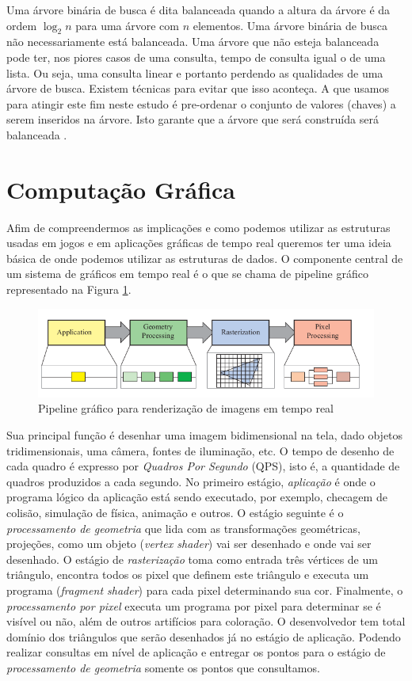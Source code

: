 Uma árvore binária de busca é dita balanceada quando a altura da árvore é da ordem $\log_{2}{n}$ para uma árvore com $n$ elementos. Uma árvore binária de busca não necessariamente está balanceada. Uma árvore que não esteja balanceada pode ter, nos piores casos de uma consulta, tempo de consulta igual o de uma lista. Ou seja, uma consulta linear e portanto perdendo as qualidades de uma árvore de busca. Existem técnicas para evitar que isso aconteça. A que usamos para atingir este fim neste estudo é pre-ordenar o conjunto de valores (chaves) a serem inseridos na árvore. Isto garante que a árvore que será construída será balanceada \cite{cormen1}.

\section{Computação Gráfica}\label{cap:cg}
Afim de compreendermos as implicações e como podemos utilizar as estruturas usadas em jogos e em aplicações gráficas de tempo real queremos ter uma ideia básica de onde podemos utilizar as estruturas de dados. O componente central de um sistema de gráficos em tempo real é o que se chama de pipeline gráfico representado na Figura \ref{fig:graphical_pipeline}. 

\begin{figure}[h!]
    \centering
    \includegraphics[scale=0.5]{images/Captura de tela de 2021-04-16 19-23-57.png}
    \caption{\cite{rtr1} Pipeline gráfico para renderização de imagens em tempo real}
    \label{fig:graphical_pipeline}
\end{figure}

Sua principal função é desenhar uma imagem bidimensional na tela, dado objetos tridimensionais, uma câmera, fontes de iluminação, etc. O tempo de desenho de cada quadro é expresso por \emph{Quadros Por Segundo} (QPS), isto é, a quantidade de quadros produzidos a cada segundo. No primeiro estágio, \emph{aplicação} é onde o programa lógico da aplicação está sendo executado, por exemplo, checagem de colisão, simulação de física, animação e outros. O estágio seguinte é o \emph{processamento de geometria} que lida com as transformações geométricas, projeções, como um objeto (\emph{vertex shader}) vai ser desenhado e onde vai ser desenhado. O estágio de \emph{rasterização} toma como entrada três vértices de um triângulo, encontra todos os pixel que definem este triângulo e executa um programa (\emph{fragment shader}) para cada pixel determinando sua cor. Finalmente, o \emph{processamento por pixel} executa um programa por pixel para determinar se é visível ou não, além de outros artifícios para coloração. O desenvolvedor tem total domínio dos triângulos que serão desenhados já no estágio de aplicação. Podendo realizar consultas em nível de aplicação e entregar os pontos para o estágio de \emph{processamento de geometria} somente os pontos que consultamos.

